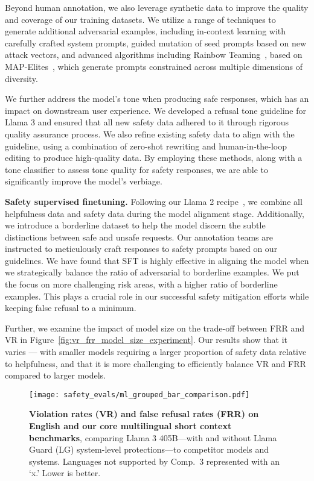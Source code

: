 Beyond human annotation, we also leverage synthetic data to improve the quality and coverage of our training datasets. We utilize a range of techniques to generate additional adversarial examples, including in-context learning with carefully crafted system prompts, guided mutation of seed prompts based on new attack vectors, and advanced algorithms including Rainbow Teaming~\citep{samvelyan2024rainbowteamingopenendedgeneration}, based on MAP-Elites~\citep{mouret2015illuminatingsearchspacesmapping}, which generate prompts constrained across multiple dimensions of diversity.

We further address the model's tone when producing safe responses, which has an impact on downstream user experience. We developed a refusal tone guideline for Llama 3 and ensured that all new safety data adhered to it through rigorous quality assurance process. We also refine existing safety data to align with the guideline, using a combination of zero-shot rewriting and human-in-the-loop editing to produce high-quality data. By employing these methods, along with a tone classifier to assess tone quality for safety responses, we are able to significantly improve the model's verbiage. 


\textbf{Safety supervised finetuning.}
Following our Llama 2 recipe~\citep{touvron2023llama2}, we combine all helpfulness data and safety data during the model alignment stage.
Additionally, we introduce a borderline dataset to help the model discern the subtle distinctions between safe and unsafe requests. Our annotation teams are instructed to meticulously craft responses to safety prompts based on our guidelines.
We have found that SFT is highly effective in aligning the model when we strategically balance the ratio of adversarial to borderline examples. We put the focus on more challenging risk areas, with a higher ratio of borderline examples. This plays a crucial role in our successful safety mitigation efforts while keeping false refusal to a minimum.

Further, we examine the impact of model size on the trade-off between FRR and VR in Figure~\ref{fig:vr_frr_model_size_experiment}. Our results show that it varies --- with smaller models requiring a larger proportion of safety data relative to helpfulness, and that it is more challenging to efficiently balance VR and FRR compared to larger models.

\begin{figure}[t]
    \centering
    \texttt{[image: safety\_evals/ml\_grouped\_bar\_comparison.pdf]}
    \caption{\textbf{Violation rates (VR) and false refusal rates (FRR) on English and our core multilingual short context benchmarks}, comparing Llama 3 405B---with and without Llama Guard (LG) system-level protections---to competitor models and systems. Languages not supported by Comp.~3 represented with an ‘x.’ Lower is better.}
    \label{fig:safetyevals_sc}
\end{figure}

